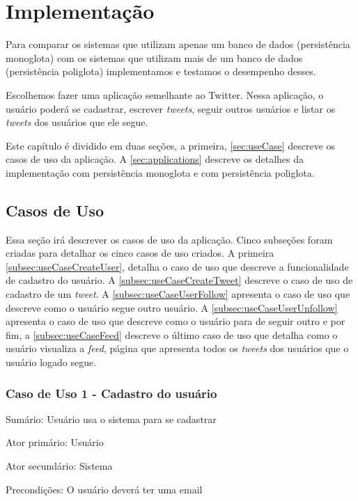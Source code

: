 \chapter{Implementação}
\label{chap:implementacao}

Para comparar os sistemas que utilizam apenas um banco de dados (persistência monoglota) com os sistemas que utilizam mais de um banco de dados (persistência poliglota) implementamos e testamos o desempenho desses.

Escolhemos fazer uma aplicação semelhante ao Twitter. Nessa aplicação, o usuário poderá se cadastrar, escrever \textit{tweets}, seguir outros usuários e listar os \textit{tweets} dos usuários que ele segue.

Este capítulo é dividido em duas seções, a primeira, \autoref{sec:useCase} descreve os casos de uso da aplicação. A \autoref{sec:applications} descreve os detalhes da implementação com persistência monoglota e com persistência poliglota.

\section{Casos de Uso}
\label{sec:useCase}
Essa seção irá descrever os casos de uso da aplicação. Cinco subseções foram criadas para detalhar os cinco casos de uso criados. A primeira \autoref{subsec:useCaseCreateUser}, detalha o caso de uso que descreve a funcionalidade de cadastro do usuário. A \autoref{subsec:useCaseCreateTweet} descreve o caso de uso de cadastro de um \textit{tweet}. A \autoref{subsec:useCaseUserFollow} apresenta o caso de uso que descreve como o usuário segue outro usuário. A \autoref{subsec:useCaseUserUnfollow} apresenta o caso de uso que descreve como o usuário para de seguir outro e por fim, a \autoref{subsec:useCaseFeed} descreve o último caso de uso que detalha como o usuário visualiza a \textit{feed}, página que apresenta todos os \textit{tweets} dos usuários que o usuário logado segue.


\subsection{Caso de Uso 1 - Cadastro do usuário}
\label{subsec:useCaseCreateUser}

Sumário: Usuário usa o sistema para se cadastrar

Ator primário: Usuário

Ator secundário: Sistema

Precondições: O usuário deverá ter uma email


